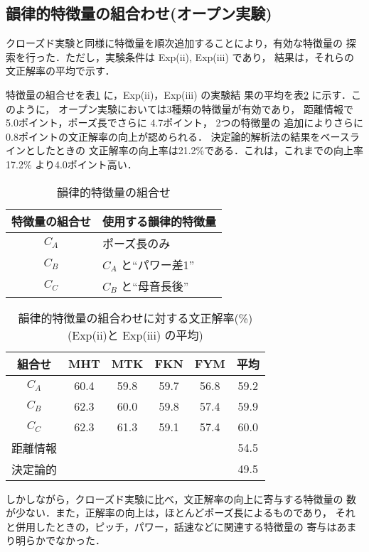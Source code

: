 \subsection{韻律的特徴量の組合わせ(オープン実験)}

クローズド実験と同様に特徴量を順次追加することにより，有効な特徴量の
探索を行った．ただし，実験条件は Exp(ii), Exp(iii) であり，
結果は，それらの文正解率の平均で示す．


特徴量の組合せを表\ref{cond:4} に，Exp(ii)，Exp(iii) の実験結
果の平均を表\ref{res:8} に示す．このように，
オープン実験においては3種類の特徴量が有効であり，
距離情報で 5.0ポイント，ポーズ長でさらに 4.7ポイント，
2つの特徴量の
追加によりさらに 0.8ポイントの文正解率の向上が認められる．
決定論的解析法の結果をベースラインとしたときの
文正解率の向上率は21.2\%である．これは，これまでの向上率17.2\% 
\cite{KOU-1}より4.0ポイント高い．

\begin{table}
\begin{center}
\caption{韻律的特徴量の組合せ}
\label{cond:4}
\begin{tabular}{cl}
\hline
\hline
特徴量の組合せ & 使用する韻律的特徴量\\
\hline
$C_A$ & ポーズ長のみ\\
$C_B$ & $C_A$ と``パワー差1''\\
$C_C$ & $C_B$ と``母音長後''\\
\hline
\hline
\end{tabular}
\end{center}
\end{table}
\begin{table}
\begin{center}
\caption{韻律的特徴量の組合わせに対する文正解率(\%) (Exp(ii)と
Exp(iii) の平均)}
\label{res:8}
\begin{tabular}{|c|c|c|c|c|c|}
\hline
組合せ   	&MHT	&MTK	&FKN	&FYM& 平均\\
\hline
\hline
$C_A$     	&60.4  &59.8  &59.7  &56.8&	59.2\\
$C_B$     	&62.3  &60.0  &59.8  &57.4&	59.9\\
$C_C$     	&62.3  &61.3  &59.1  &57.4&	60.0\\
\hline
距離情報	&	&	&	&&54.5\\
\hline
決定論的	&	&	&	&&49.5\\
\hline
\end{tabular}
\end{center}
\end{table}
しかしながら，クローズド実験に比べ，文正解率の向上に寄与する特徴量の
数が少ない．また，正解率の向上は，ほとんどポーズ長によるものであり，
それと併用したときの，ピッチ，パワー，話速などに関連する特徴量の
寄与はあまり明らかでなかった．

